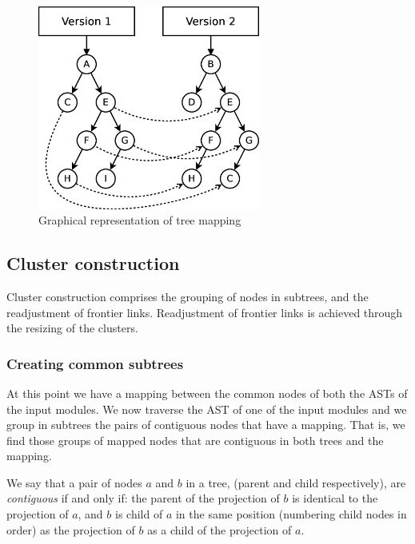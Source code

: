 \begin{figure}
\centering
\includegraphics[width=0.65\textwidth]{figures/automatic_beh_inf/diagrams/dia2}
\par

\caption{Graphical representation of tree 
mapping\label{fig:tree-mapping-example}}
\end{figure}



\subsection{Cluster construction\label{sub:cluster-cons}}

Cluster construction comprises the grouping of nodes in subtrees,
and the readjustment of frontier links. Readjustment of frontier links is 
achieved
through the resizing of the clusters.


\subsubsection{Creating common subtrees}

At this point we have a mapping between the common nodes of both the
ASTs of the input modules. We now traverse the AST of one of the input
modules and we group in subtrees the pairs of contiguous nodes that
have a mapping. That is, we find those groups of mapped nodes that
are contiguous in both trees and the mapping.

We say that a pair of nodes $a$ and $b$ in a tree, (parent and child 
respectively),
are \emph{contiguous} if and only if: the parent of the projection of $b$
is identical to the projection of $a$, and $b$ is child of $a$
in the same position (numbering child nodes in order) as the projection
of $b$ as a child of the projection of $a$.

